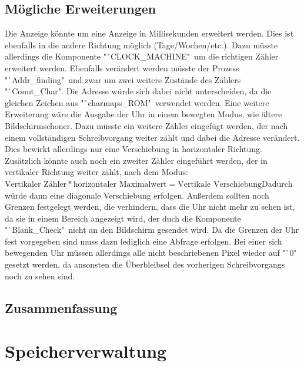 \documentclass[12pt,a4paper,bibliography=totoc,listof=totoc]{scrartcl}
\begin{document}
\subsection{Mögliche Erweiterungen}
Die Anzeige könnte um eine Anzeige in Millisekunden erweitert werden. Dies ist ebenfalls in die andere Richtung möglich (Tage/Wochen/etc.). 
Dazu müsste allerdings die Komponente "`CLOCK\_MACHINE"\, um die richtigen Zähler erweitert werden. Ebenfalls verändert werden müsste der Prozess 
"`Addr\_finding"\, und zwar um zwei weitere Zustände des Zählers "`Count\_Char". Die Adresse würde sich dabei nicht unterscheiden, da die gleichen 
Zeichen aus "`charmaps\_ROM" \,verwendet werden.\newline
Eine weitere Erweiterung wäre die Ausgabe der Uhr in einem bewegten Modus, wie ältere Bildschirmschoner. Dazu müsste ein weitere Zähler eingefügt 
werden, der nach einem vollständigen Schreibvorgang weiter zählt und dabei die Adresse verändert. Dies bewirkt allerdings nur eine Verschiebung in 
horizontaler Richtung. Zusätzlich könnte auch noch ein zweiter Zähler eingeführt werden, der in vertikaler Richtung weiter zählt, nach dem 
Modus: \newline $\text{Vertikaler Zähler} * \text{horizontaler Maximalwert} = \text{Vertikale Verschiebung}$\newline Dadurch würde dann eine diagonale Verschiebung erfolgen. Außerdem sollten noch Grenzen festgelegt 
werden, die verhindern, dass die Uhr nicht mehr zu sehen ist, da sie in einem Bereich angezeigt wird, der duch die Komponente "`Blank\_Check"\, nicht an 
den Bildschirm gesendet wird. Da die Grenzen der Uhr fest vorgegeben sind muss dazu lediglich eine Abfrage erfolgen.
Bei einer sich bewegenden Uhr müssen allerdings alle nicht beschriebenen Pixel wieder auf "`0" \,gesetzt werden, da ansonsten die Überbleibsel des 
vorherigen Schreibvorgangs noch zu sehen sind.

\subsection{Zusammenfassung}

\pagebreak
\section{Speicherverwaltung}
\end{document}
